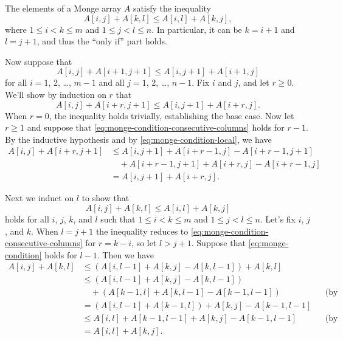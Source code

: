 The elements of a Monge array $A$ satisfy the inequality
\[
    A[i,j]+A[k,l] \le A[i,l]+A[k,j],
\]
where $1\le i<k\le m$ and $1\le j<l\le n$.
In particular, it can be $k=i+1$ and $l=j+1$, and thus the ``only if'' part holds.

Now suppose that
\begin{equation} \label{eq:monge-condition-local}
    A[i,j]+A[i+1,j+1] \le A[i,j+1]+A[i+1,j]
\end{equation}
for all $i=1$, 2, \dots, $m-1$ and all $j=1$, 2, \dots, $n-1$.
Fix $i$ and $j$, and let $r\ge0$.
We'll show by induction on $r$ that
\begin{equation} \label{eq:monge-condition-consecutive-columns}
    A[i,j]+A[i+r,j+1] \le A[i,j+1]+A[i+r,j].
\end{equation}
When $r=0$, the inequality holds trivially, establishing the base case.
Now let $r\ge1$ and suppose that \eqref{eq:monge-condition-consecutive-columns} holds for $r-1$.
By the inductive hypothesis and by \eqref{eq:monge-condition-local}, we have
\begin{align*}
    A[i,j]+A[i+r,j+1] &\le A[i,j+1]+A[i+r-1,j]-A[i+r-1,j+1] \\
    &\quad {}+A[i+r-1,j+1]+A[i+r,j]-A[i+r-1,j] \\
    &= A[i,j+1]+A[i+r,j].
\end{align*}

Next we induct on $l$ to show that
\begin{equation} \label{eq:monge-condition}
    A[i,j]+A[k,l] \le A[i,l]+A[k,j]
\end{equation}
holds for all $i$, $j$, $k$, and $l$ such that $1\le i<k\le m$ and $1\le j<l\le n$.
Let's fix $i$, $j$, and $k$.
When $l=j+1$ the inequality reduces to \eqref{eq:monge-condition-consecutive-columns} for $r=k-i$, so let $l>j+1$.
Suppose that \eqref{eq:monge-condition} holds for $l-1$.
Then we have
\begin{align*}
    A[i,j]+A[k,l] &\le (A[i,l-1]+A[k,j]-A[k,l-1])+A[k,l] \\
    &\le (A[i,l-1]+A[k,j]-A[k,l-1]) \\
    &\quad {}+(A[k-1,l]+A[k,l-1]-A[k-1,l-1]) && \text{(by (1))} \\
    &= (A[i,l-1]+A[k-1,l])+A[k,j]-A[k-1,l-1] \\
    &\le A[i,l]+A[k-1,l-1]+A[k,j]-A[k-1,l-1] && \text{(by (2))} \\
    &= A[i,l]+A[k,j].
\end{align*}
